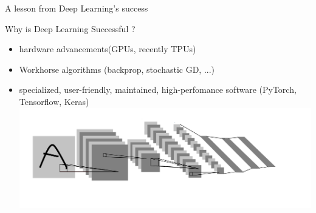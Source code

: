 \begin{frame}{A lesson from Deep Learning's success}
	\begin{Large}
		Why is Deep Learning \alert{Successful} ? 
	\end{Large}

	\begin{itemize}
		\item hardware advancements(GPUs, recently TPUs)
		\item Workhorse algorithms (backprop, stochastic GD, ...)
		\item specialized, user-friendly, maintained, high-perfomance software (PyTorch, Tensorflow, Keras)
		\includegraphics[width=\linewidth]{lenet-5}
	\end{itemize}	
\end{frame}

